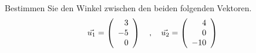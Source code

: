 \begin{aufgabe} ~ \\ 
Bestimmen Sie den Winkel zwischen den beiden folgenden Vektoren.\[\vec{u_1}=\left(\begin{array}{r} 3 \\ -5 \\ 0 \end{array}\right) \quad,\quad \vec{u_2}=\left(\begin{array}{r} 4 \\ 0 \\ -10 \end{array}\right)\]\end{aufgabe} 
